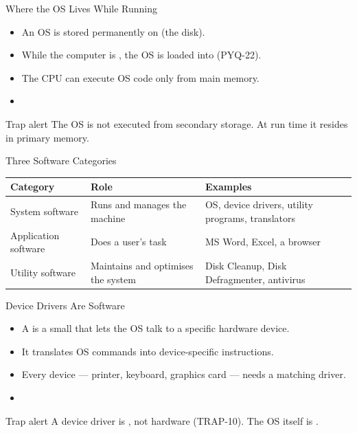 \documentclass[aspectratio=169]{beamer}
\begin{document}
\begin{frame}{Where the OS Lives While Running}
  \begin{itemize}
    \item An OS is stored permanently on  (the disk).
    \item While the computer is , the OS is loaded into
       (PYQ-22).
    \item The CPU can execute OS code only from main memory.
    \item {}
  \end{itemize}
  \begin{alertblock}{Trap alert}
    The OS is not executed from secondary storage. At run time it resides in
    primary memory.
  \end{alertblock}
\end{frame}

\begin{frame}{Three Software Categories}
  \begin{center}
    \begin{tabular}{p{}p{}p{}}
      \toprule
      \textbf{Category} & \textbf{Role} & \textbf{Examples} \\
      \midrule
      System software & Runs and manages the machine & OS, device drivers, utility programs, translators \\
      Application software & Does a user's task & MS Word, Excel, a browser \\
      Utility software & Maintains and optimises the system & Disk Cleanup, Disk Defragmenter, antivirus \\
      \bottomrule
    \end{tabular}
  \end{center}
  \vspace{0.25cm}
\end{frame}

\begin{frame}{Device Drivers Are Software}
  \begin{itemize}
    \item A  is a small  that lets
      the OS talk to a specific hardware device.
    \item It translates OS commands into device-specific instructions.
    \item Every device --- printer, keyboard, graphics card --- needs a
      matching driver.
    \item {}
  \end{itemize}
  \begin{alertblock}{Trap alert}
    A device driver is , not hardware (TRAP-10). The OS itself
    is .
  \end{alertblock}
\end{frame}
\end{document}
